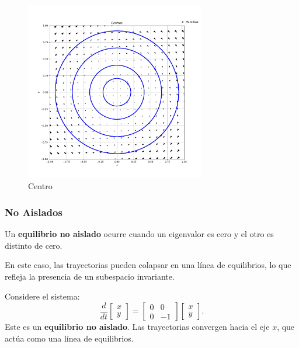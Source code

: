 \begin{figure}[h]
    \centering
    \includegraphics[width=0.7\textwidth]{Img/Centros.png}
    \caption{Centro}
    \label{fig:centro}
\end{figure}

\newpage

\subsubsection{No Aislados}

\begin{definition}
Un \textbf{equilibrio no aislado} ocurre cuando un eigenvalor es cero y el otro es distinto de cero.
\end{definition}

En este caso, las trayectorias pueden colapsar en una línea de equilibrios, lo que refleja la presencia de un subespacio invariante.

\begin{example}
Considere el sistema:
\[
\frac{d}{dt} \begin{bmatrix} x \\ y \end{bmatrix} = \begin{bmatrix} 0 & 0 \\ 0 & -1 \end{bmatrix} \begin{bmatrix} x \\ y \end{bmatrix}.
\]
Este es un \textbf{equilibrio no aislado}. Las trayectorias convergen hacia el eje $x$, que actúa como una línea de equilibrios.
\end{example}

